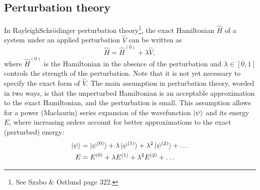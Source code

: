 \documentclass[%
class = book,%
crop = false,%
float = true,%
multi = true,%
preview = false,%
]{standalone}
\let\cite\autocite
\begin{document}
\subsection{Perturbation theory}
\label{ssec:perturbation-theory}

In Rayleigh\textendash{}Schr{\"{o}}dinger perturbation theory\footnote{See Szabo \& Ostlund\cite{szabo1989modern} page 322.}, the exact Hamiltonian \(\hat{H}\) of a system under an applied perturbation \(\hat{V}\) can be written as
\begin{equation}
  \label{eq:perturbed-hamiltonian}
  \hat{H} = \hat{H}^{(0)} + \lambda\hat{V},
\end{equation}
where \(\hat{H}^{(0)}\) is the Hamiltonian in the absence of the perturbation and \(\lambda \in [0,1]\) controls the strength of the perturbation. Note that it is not yet necessary to specify the exact form of \(\hat{V}\). The main assumption in perturbation theory, worded in two ways, is that the unperturbed Hamiltonian is an acceptable approximation to the exact Hamiltonian, and the perturbation is small. This assumption allows for a power (Maclaurin) series expansion of the wavefunction \(\ket{\psi}\) and its energy \(E\), where increasing orders account for better approximations to the exact (perturbed) energy:
\begin{align}
  \label{eq:expansion-wavefunction}
  \ket{\psi} &= \ket{\psi^{(0)}} + \lambda\ket{\psi^{(1)}} + \lambda^{2}\ket{\psi^{(2)}} + \dots \\
  \label{eq:expansion-energy}
  E &= E^{(0)} + \lambda E^{(1)} + \lambda^{2} E^{(2)} + \dots
\end{align}
\end{document}
